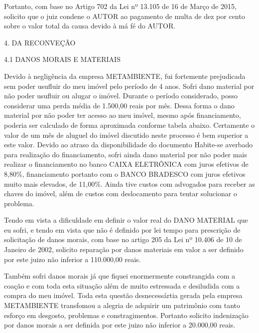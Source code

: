 \documentclass[11pt]{letter}
\begin{document}
Portanto, com base no Artigo 702 da Lei nº 13.105 de 16 de Março de 2015, solicito que o juiz condene o AUTOR ao pagamento de multa de dez por cento sobre o valor total da causa devido à má fé do AUTOR.

4. DA RECONVEÇÃO

4.1 DANOS MORAIS E MATERIAIS 
 
Devido à negligência da empresa METAMBIENTE, fui fortemente prejudicada sem poder usufluir do meu imóvel pelo período de 4 anos. Sofri dano material por não poder usufluir ou alugar o imóvel. Durante o período considerado, posso considerar uma perda média de 1.500,00 reais por mês. Dessa forma o dano material por não poder ter acesso ao meu imóvel, mesmo após financiamento, poderia ser calculado de forma aproximada conforme tabela abaixo. Certamente o valor de um mês de aluguel do imóvel discutido neste processo é bem superior a este valor. Devido ao atraso da disponibilidade do documento Habite-se averbado para realização do financiamento, sofri ainda dano material por não poder mais realizar o financiamento no banco CAIXA ELETRÔNICA com juros efetivos de 8,80\%, financiamento portanto com o BANCO BRADESCO com juros efetivos muito mais elevados, de 11,00\%. Ainda tive custos com advogados para receber as chaves do imóvel, além de custos com deslocamento para tentar solucionar o problema.

Tendo em vista a dificuldade em definir o valor real do DANO MATERIAL que eu sofri, e tendo em vista que não é definido por lei tempo para prescrição de solicitação de danos morais, com base no artigo 205 da Lei nº 10.406 de 10 de Janeiro de 2002, solicito reparação por danos materiais em valor a ser definido por este juizo não inferior a 110.000,00 reais.

Também sofri danos morais já que fiquei enormermente constrangida com a coação e com toda esta situação além de muito estressada e desiludida com a compra do meu imóvel. Toda esta questão desnecessártia gerada pela empresa METAMBIENTE transfomou a alegria de adquirir um patrimônio com tanto esforço em desgosto, problemas e constragimentos. Portanto solicito indenização por danos morais a ser definida por este juizo não inferior a 20.000,00 reais. 
\end{document}
